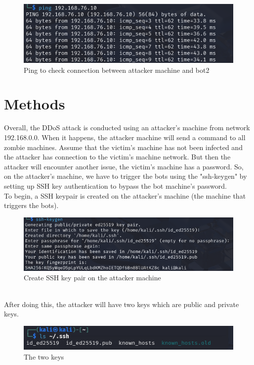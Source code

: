 \begin{figure}[!htb]
    \centering
    \includegraphics[width=0.8\linewidth]{thesis/kaliToBot2.png}
    \caption{Ping to check connection between attacker machine and bot2}
    \label{fig:enter-label}
\end{figure}
\pagebreak
\section{Methods} 
Overall, the DDoS attack is conducted using an attacker's machine from network 192.168.0.0. When it happens, the attacker machine will send a command to all zombie machines. Assume that the victim's machine has not been infected and the attacker has connection to the victim's machine network. But then the attacker will encounter another issue, the victim's machine has a password. So, on the attacker's machine, we have to trigger the bots using the "ssh-keygen" by setting up SSH key authentication to bypass the bot machine's password. 
\\
To begin, a SSH keypair is created on the attacker's machine (the machine that triggers the bots).
\begin{figure}[h]
    \centering
    \includegraphics[width=0.8\linewidth]{thesis/ssh-keygen.png}
    \caption{Create SSH key pair on the attacker machine}
    \label{fig:enter-label}
\end{figure}
\\ After doing this, the attacker will have two keys which are public and private keys.
\begin{figure}[!htb]
    \centering
    \includegraphics[width=0.8\linewidth]{thesis/2keys.png}
    \caption{The two keys}
    \label{fig:enter-label}
\end{figure}
